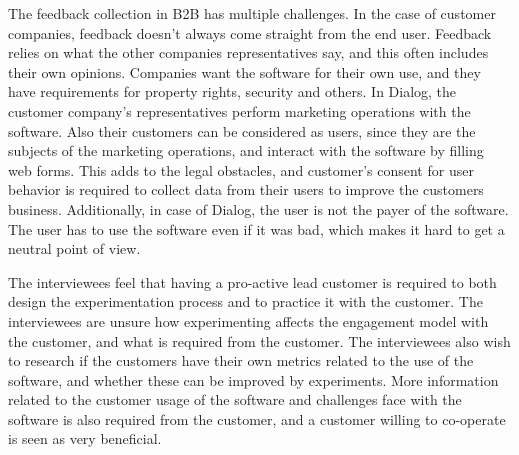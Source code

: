 \documentclass[english]{tktltiki2}
\theoremstyle{definition}
\theoremstyle{remark}
\begin{document}
The feedback collection in B2B has multiple challenges. In the case of customer companies, feedback doesn't always come straight from the end user. Feedback relies on what the other companies representatives say, and this often includes their own opinions. Companies want the software for their own use, and they have requirements for property rights, security and others. In Dialog, the customer company's representatives perform marketing operations with the software. Also their customers can be considered as users, since they are the subjects of the marketing operations, and interact with the software by filling web forms. This adds to the legal obstacles, and customer's consent for user behavior is required to collect data from their users to improve the customers business. Additionally, in case of Dialog, the user is not the payer of the software. The user has to use the software even if it was bad, which makes it hard to get a neutral point of view. 

The interviewees feel that having a pro-active lead customer is required to both design the experimentation process and to practice it with the customer. The interviewees are unsure how experimenting affects the engagement model with the customer, and what is required from the customer. The interviewees also wish to research if the customers have their own metrics related to the use of the software, and whether these can be improved by experiments. More information related to the customer usage of the software and challenges face with the software is also required from the customer, and a customer willing to co-operate is seen as very beneficial. 
\end{document}
